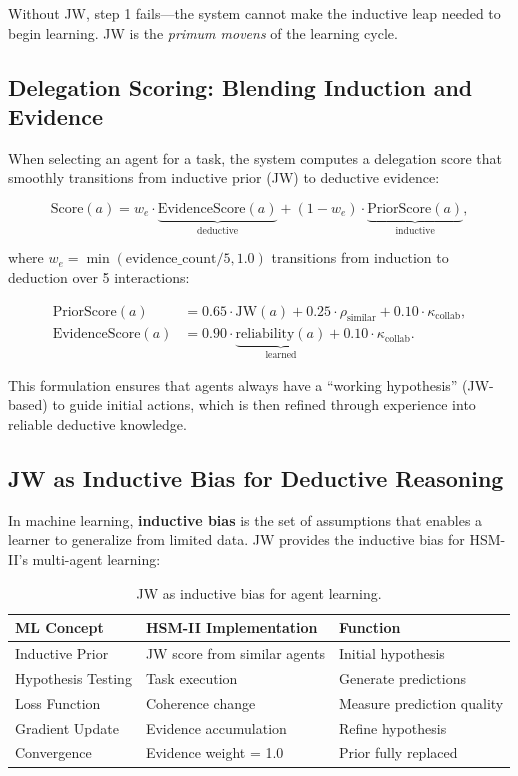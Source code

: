 \documentclass[11pt]{article}
\begin{document}
Without JW, step 1 fails---the system cannot make the inductive leap needed
to begin learning. JW is the \textit{primum movens} of the learning cycle.

\subsection{Delegation Scoring: Blending Induction and Evidence}

When selecting an agent for a task, the system computes a delegation score
that smoothly transitions from inductive prior (JW) to deductive evidence:

\begin{equation}
  \text{Score}(a) = w_e \cdot \underbrace{\text{EvidenceScore}(a)}_{\text{deductive}} + (1-w_e) \cdot \underbrace{\text{PriorScore}(a)}_{\text{inductive}},
  \label{eq:delegation}
\end{equation}

where $w_e = \min(\text{evidence\_count}/5, 1.0)$ transitions from
induction to deduction over 5 interactions:

\begin{align}
  \text{PriorScore}(a) &= 0.65 \cdot \text{JW}(a) + 0.25 \cdot \rho_{\text{similar}} + 0.10 \cdot \kappa_{\text{collab}}, \\
  \text{EvidenceScore}(a) &= 0.90 \cdot \underbrace{\text{reliability}(a)}_{\text{learned}} + 0.10 \cdot \kappa_{\text{collab}}.
\end{align}

This formulation ensures that agents always have a ``working hypothesis''
(JW-based) to guide initial actions, which is then refined through experience
into reliable deductive knowledge.

\subsection{JW as Inductive Bias for Deductive Reasoning}

In machine learning, \textbf{inductive bias} is the set of assumptions that
enables a learner to generalize from limited data. JW provides the inductive
bias for HSM-II's multi-agent learning:

\begin{table}[H]
\centering
\caption{JW as inductive bias for agent learning.}
\label{tab:inductive_bias}
\small
\begin{tabular}{lll}
\toprule
\textbf{ML Concept} & \textbf{HSM-II Implementation} & \textbf{Function} \\
\midrule
Inductive Prior & JW score from similar agents & Initial hypothesis \\
Hypothesis Testing & Task execution & Generate predictions \\
Loss Function & Coherence change & Measure prediction quality \\
Gradient Update & Evidence accumulation & Refine hypothesis \\
Convergence & Evidence weight = 1.0 & Prior fully replaced \\
\bottomrule
\end{tabular}
\end{table}
\end{document}
